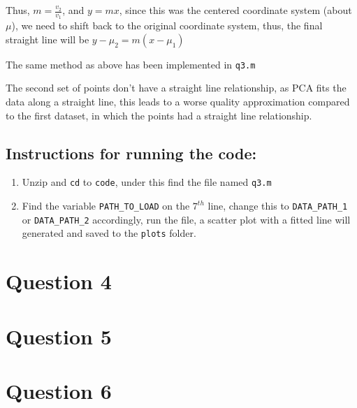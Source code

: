 \documentclass[11pt, fleqn]{article}
\begin{document}
\medskip
Thus, $m = \frac{v_2}{v_1}$, and $y = mx$, since this was the centered coordinate system (about $\mu$), we need to shift back to the original coordinate system, thus, the final straight line will be $y-\mu_2 = m(x - \mu_1)$

\medskip
The same method as above has been implemented in \texttt{q3.m}

\medskip
The second set of points don't have a straight line relationship, as PCA fits the data along a straight line, this leads to a worse quality approximation compared to the first dataset, in which the points had a straight line relationship.

\subsection*{Instructions for running the code:}
\begin{enumerate}[itemsep=-1ex]
    \item Unzip and \texttt{cd} to \texttt{code}, under this find the file named \texttt{q3.m}
    \item Find the variable \texttt{PATH\_TO\_LOAD} on the $7^{th}$ line, change this to \texttt{DATA\_PATH\_1} or \texttt{DATA\_PATH\_2} accordingly, run the file, a scatter plot with a fitted line will generated and saved to the \texttt{plots} folder.
\end{enumerate}

\newpage
\section*{Question 4}
\setcounter{equation}{0}
\setcounter{figure}{0}

\newpage
\section*{Question 5}
\setcounter{equation}{0}
\setcounter{figure}{0}

\newpage
\section*{Question 6}
\setcounter{equation}{0}
\setcounter{figure}{0}
\end{document}
